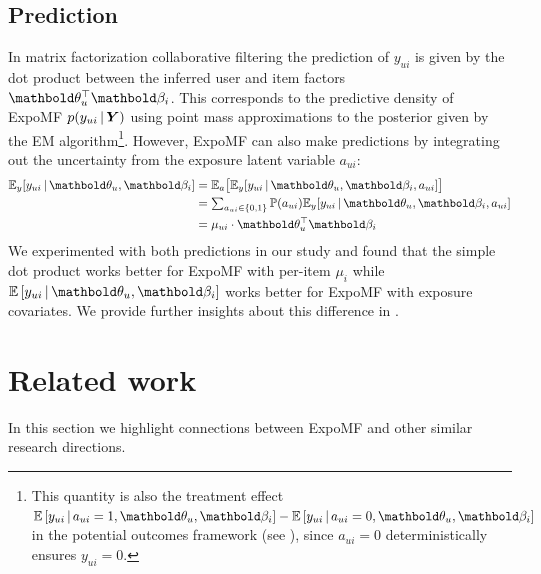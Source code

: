 \subsection{Prediction} \label{chpt:expomf:sec:pred}
In matrix factorization collaborative filtering the prediction of $y_{ui}$ is given by the dot product between the inferred user and item factors $\mb\theta_u^\top\mb\beta_i$. This corresponds to the predictive density of ExpoMF $p(y_{ui} \,\vert\, \boldsymbol{Y})$ using point mass approximations to the posterior given by the EM algorithm\footnote{This quantity is also the treatment effect $\E{y_{ui} \g a_{ui}=1, \mb\theta_u, \mb\beta_i} - \E{y_{ui} \g a_{ui}=0, \mb\theta_u, \mb\beta_i}$ in the potential outcomes framework (see ), since $a_{ui}=0$ deterministically ensures $y_{ui}=0$.}. 
However, ExpoMF can also make predictions by integrating out the uncertainty from the exposure latent variable $a_{ui}$:
\begin{equation*}
\begin{split}
\mathbb{E}_y[y_{ui} \g \mb\theta_u, \mb\beta_i] &= \mathbb{E}_a\big[\mathbb{E}_y [y_{ui} \g \mb\theta_u, \mb\beta_i, a_{ui}]\big]\\
&= \textstyle\sum_{a_{ui}\in \{0, 1\}} \mathbb{P}(a_{ui}) \mathbb{E}_y [y_{ui} \g \mb\theta_u, \mb\beta_i, a_{ui}] \\
&= \mu_{ui} \cdot \mb\theta_u^\top\mb\beta_i
\end{split}
\end{equation*}
We experimented with both predictions in our study and found that the
simple dot product works better for ExpoMF with per-item $\mu_i$ while
$\E{y_{ui} \g \mb\theta_u, \mb\beta_i}$ works better for ExpoMF with exposure covariates. We provide further insights about this difference in .


\section{Related work}
\label{chpt:expomf:sec:related}

In this section we highlight connections between ExpoMF and other
similar research directions. 



